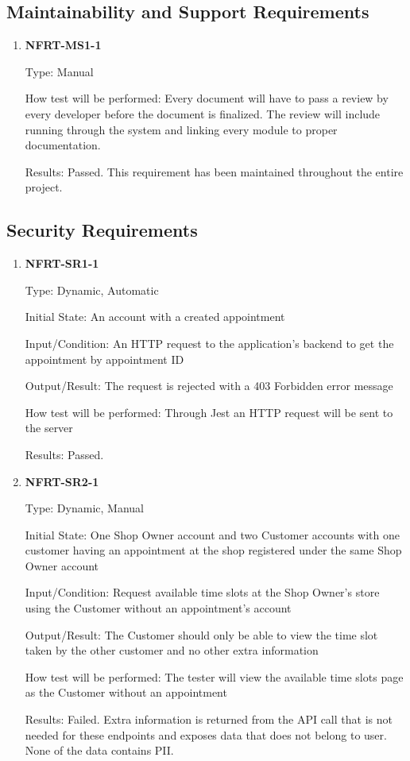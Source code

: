 \documentclass[12pt, titlepage]{article}
\begin{document}
\subsection{Maintainability and Support Requirements}
\begin{enumerate}
	\item \textbf{NFRT-MS1-1}

	      Type: Manual

	      How test will be performed: Every document will have to pass a review by every developer before the
	      document is finalized. The review will include running through the system and linking every module
	      to proper documentation.

	      Results: Passed. This requirement has been maintained throughout the entire project.

\end{enumerate}

\subsection{Security Requirements}
\begin{enumerate}

	\item \textbf{NFRT-SR1-1}

	      Type: Dynamic, Automatic

	      Initial State: An account with a created appointment

	      Input/Condition: An HTTP request to the application's backend to get the appointment by appointment
	      ID

	      Output/Result: The request is rejected with a 403 Forbidden error message

	      How test will be performed: Through Jest an HTTP request will be sent to the server

	      Results: Passed.

	\item \textbf{NFRT-SR2-1}

	      Type: Dynamic, Manual

	      Initial State: One Shop Owner account and two Customer accounts with one customer having an
	      appointment at the shop registered under the same Shop Owner account

	      Input/Condition: Request available time slots at the Shop Owner's store using the Customer without
	      an appointment's account

	      Output/Result: The Customer should only be able to view the time slot taken by the other customer
	      and no other extra information

	      How test will be performed: The tester will view the available time slots page as the Customer
	      without an appointment

	      Results: Failed. Extra information is returned from the API call that is not needed for these
	      endpoints and exposes data that does not belong to user. None of the data contains PII.

\end{enumerate}
\end{document}
